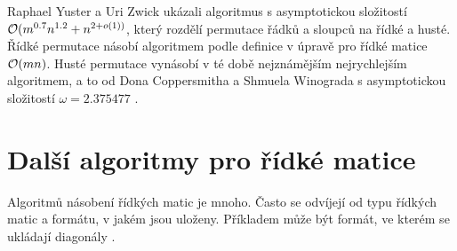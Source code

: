 Raphael Yuster a Uri Zwick ukázali algoritmus \cite{DBLP:journals/talg/YusterZ05} s asymptotickou složitostí $\mathcal{O}(m^{0.7}n^{1.2}+n^{2+o(1))}$, který rozdělí permutace řádků a sloupců na řídké a husté. Řídké permutace násobí algoritmem podle definice v úpravě pro řídké matice $\mathcal{O}(mn)$. Husté permutace vynásobí v té době nejznámějším nejrychlejším algoritmem, a to od Dona Coppersmitha a Shmuela Winograda s asymptotickou složitostí $\omega=2.375477$ \cite{DBLP:journals/jsc/CoppersmithW90}.

\section{Další algoritmy pro řídké matice}

Algoritmů násobení řídkých matic je mnoho. Často se odvíjejí od typu řídkých matic a formátu, v jakém jsou uloženy. Příkladem může být formát, ve kterém se ukládají diagonály \cite{diagonalTvrdikSimecek}.
